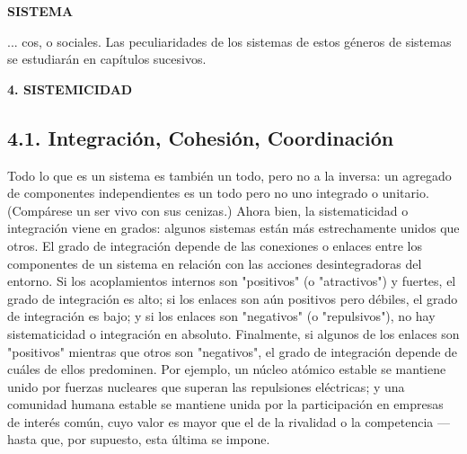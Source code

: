 \newpage
\fancyhf{}
\fancyhead[r]{\thepage}
\begin{center}
{\fontsize{16}{18}\selectfont \textbf{SISTEMA}}
\end{center}
\vspace{0.5cm}

{\fontsize{13}{15}\selectfont
... cos, o sociales. Las peculiaridades de los sistemas de estos géneros de sistemas se estudiarán en capítulos sucesivos.

\vspace{0.5cm}
\begin{center}
{\fontsize{15}{17}\selectfont \textbf{4. SISTEMICIDAD}}
\end{center}
\vspace{0.5cm}

\subsection*{4.1. Integración, Cohesión, Coordinación}

Todo lo que es un sistema es también un todo, pero no a la inversa: un agregado de componentes independientes es un todo pero no uno integrado o unitario. (Compárese un ser vivo con sus cenizas.) Ahora bien, la sistematicidad o integración viene en grados: algunos sistemas están más estrechamente unidos que otros. El grado de integración depende de las conexiones o enlaces entre los componentes de un sistema en relación con las acciones desintegradoras del entorno. Si los acoplamientos internos son "positivos" (o "atractivos") y fuertes, el grado de integración es alto; si los enlaces son aún positivos pero débiles, el grado de integración es bajo; y si los enlaces son "negativos" (o "repulsivos"), no hay sistematicidad o integración en absoluto. Finalmente, si algunos de los enlaces son "positivos" mientras que otros son "negativos", el grado de integración depende de cuáles de ellos predominen. Por ejemplo, un núcleo atómico estable se mantiene unido por fuerzas nucleares que superan las repulsiones eléctricas; y una comunidad humana estable se mantiene unida por la participación en empresas de interés común, cuyo valor es mayor que el de la rivalidad o la competencia —hasta que, por supuesto, esta última se impone.

}
